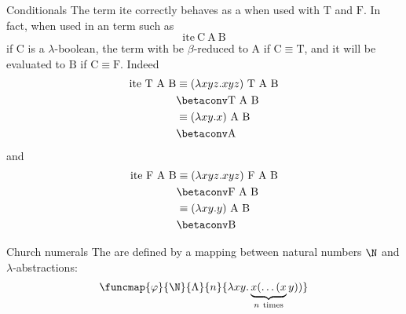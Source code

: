 \documentclass[a4paper, 12pt]{report}
\begin{document}
    \begin{framedobs}{Conditionals}
        The term $\mathrm{ite}$ correctly behaves as a  when used with $\mathrm T$ and $\mathrm F$. In fact, when used in an term such as $$\mathrm{ite} \ \mathrm C \ \mathrm A \ \mathrm B$$ if $\mathrm C$ is a $\lambda$-boolean, the term with be $\beta$-reduced to $\mathrm A$ if $\mathrm C \equiv \mathrm T$, and it will be evaluated to $\mathrm B$ if $\mathrm C \equiv \mathrm F$. Indeed
        \begin{equation*}
            \begin{split}
                \mathrm{ite} \  \mathrm T \ \mathrm A \ \mathrm B &\equiv (\lambda xyz.xyz) \ \mathrm T \ \mathrm A \ \mathrm B \\
                                                                  &\betaconv \mathrm T \ \mathrm A \ \mathrm B \\
                                                                  &\equiv (\lambda xy.x) \ \mathrm A \ \mathrm B \\
                                                                  &\betaconv \mathrm A \\
            \end{split}
        \end{equation*}
        and
        \begin{equation*}
            \begin{split}
                \mathrm{ite} \  \mathrm F \ \mathrm A \ \mathrm B &\equiv (\lambda xyz.xyz) \ \mathrm F \ \mathrm A \ \mathrm B \\
                                                                  &\betaconv \mathrm F \ \mathrm A \ \mathrm B \\
                                                                  &\equiv (\lambda xy.y) \ \mathrm A \ \mathrm B \\
                                                                  &\betaconv \mathrm B \\
            \end{split}
        \end{equation*}
    \end{framedobs}

    \begin{frameddefn}{Church numerals}
        The  are defined by a mapping between natural numbers $\N$ and $\lambda$-abstractions: $$\funcmap{\varphi}{\N}{\Lambda}{n}{\lambda xy. \underbrace{x ( \ldots ( x}_{n \ \mathrm{times}}y))}$$
    \end{frameddefn}
\end{document}
